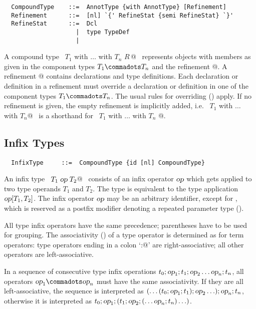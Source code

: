 \syntax\begin{lstlisting}
  CompoundType    ::=  AnnotType {with AnnotType} [Refinement]
  Refinement      ::=  [nl] `{' RefineStat {semi RefineStat} `}'
  RefineStat      ::=  Dcl
                    |  type TypeDef
                    |
\end{lstlisting}

A compound type ~\lstinline@$T_1$ with $\ldots$ with $T_n$ {$R\,$}@~
represents objects with members as given in the component types $T_1
\commadots T_n$ and the refinement @. A refinement
@ contains declarations and type definitions. Each
declaration or definition in a refinement must override a declaration
or definition in one of the component types $T_1 \commadots T_n$. The
usual rules for overriding () apply. If no
refinement is given, the empty refinement is implicitly added,
i.e. ~\lstinline@$T_1$ with $\ldots$ with $T_n$@~ is a shorthand for
~\lstinline@$T_1$ with $\ldots$ with $T_n$ {}@.
 
\subsection{Infix Types}

\syntax\begin{lstlisting}
  InfixType     ::=  CompoundType {id [nl] CompoundType}
\end{lstlisting}
An infix type ~\lstinline@$T_1\;\mbox{\sl op}\;T_2$@~ consists of an infix
operator $\mbox{\sl op}$ which gets applied to two type operands $T_1$ and
$T_2$.  The type is equivalent to the type application $\mbox{\sl op}[T_1,
T_2]$.  The infix operator $\mbox{\sl op}$ may be an arbitrary identifier,
except for \code{*}, which is reserved as a postfix modifier 
denoting a repeated parameter type (). 

All type infix operators have the same precedence; parentheses have to
be used for grouping. The associativity ()
of a type operator is determined as for term operators: type operators
ending in a colon `\lstinline@:@' are right-associative; all other
operators are left-associative.

In a sequence of consecutive type infix operations $t_0; \mbox{\sl op}_1; t_1;
\mbox{\sl op}_2 \ldots \mbox{\sl op}_n; t_n$, all operators $\op_1 \commadots \op_n$ must have the same
associativity. If they are all left-associative, the sequence is
interpreted as $(\ldots(t_0;\mbox{\sl op}_1;t_1);\mbox{\sl op}_2\ldots);\mbox{\sl op}_n;t_n$,
otherwise it is interpreted as $t_0;\mbox{\sl op}_1;(t_1;\mbox{\sl op}_2;(\ldots\mbox{\sl op}_n;t_n)\ldots)$.


